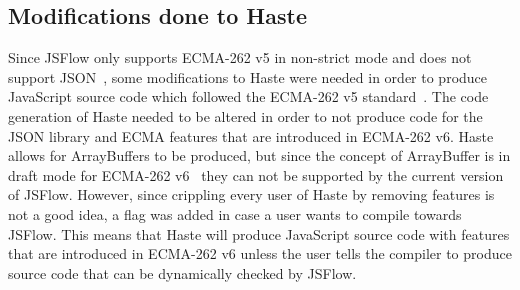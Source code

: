 \subsection{Modifications done to Haste}
Since JSFlow only supports ECMA-262 v5 in non-strict mode and does not support JSON~\cite{jsflow}, some modifications to Haste were needed in order to produce JavaScript source code which followed the ECMA-262 v5 standard~\cite{ecma262v5}. The code generation of Haste needed to be altered in order to not produce code for the JSON library and ECMA features that are introduced in ECMA-262 v6. Haste allows for ArrayBuffers to be produced, but since the concept of ArrayBuffer is in draft mode for ECMA-262 v6~\cite{js_arraybuffer, ecma_arraybuffer} they can not be supported by the current version of JSFlow. However, since crippling every user of Haste by removing features is not a good idea, a flag was added in case a user wants to compile towards JSFlow. This means that Haste will produce JavaScript source code with features that are introduced in ECMA-262 v6 unless the user tells the compiler to produce source code that can be dynamically checked by JSFlow.
